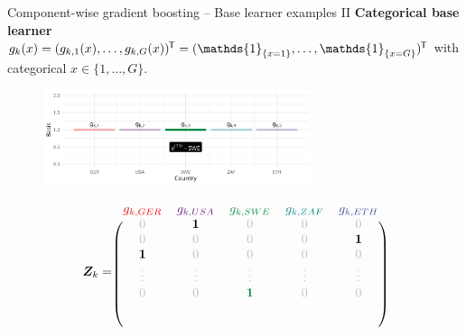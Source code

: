 \documentclass[10pt]{beamer}
\begin{document}
\begin{frame}{Component-wise gradient boosting -- Base learner examples II}
  \textbf{Categorical base learner} $g_k(x) = (g_{k,1}(x), \dots, g_{k,G}(x))^\tran = (\mathds{1}_{\{x = 1\}}, \dots, \mathds{1}_{\{x = G\}})^\tran$ with categorical $x\in\{1, \dots, G\}$.

  \begin{center}
    \begin{figure}
      \includegraphics[width=0.7\textwidth]{figures/bs-cat/fig-cat4.png}
    \end{figure}
    \vspace{-0.5cm}
    \scriptsize
    $$
      \design_k = \begin{blockarray}{ccccc}
        \color[HTML]{EE0000}g_{k,GER} & \color[HTML]{631879}g_{k,USA} & \color[HTML]{008B45}g_{k,SWE} & \color[HTML]{008280}g_{k,ZAF} & \color[HTML]{3B4992}g_{k,ETH}\\
      \begin{block}{(ccccc)}
        \color{lightgray}0 & \color{black}\bm{1} & \color{lightgray}0 & \color{lightgray}0 & \color{lightgray}0 \\
      \color{lightgray}0 & \color{lightgray}0 & \color{lightgray}0 & \color{lightgray}0 & \color{black}\bm{1} \\
      \color{black}\bm{1} & \color{lightgray}0 & \color{lightgray}0 & \color{lightgray}0 & \color{lightgray}0 \\
      \color{lightgray}\vdots & \color{lightgray}\vdots & \color{lightgray}\vdots & \color{lightgray}\vdots & \color{lightgray}\vdots \\
      \color{lightgray}0 & \color{lightgray}0 & \color[HTML]{008B45}\bm{1} & \color{lightgray}0 & \color{lightgray}0 \\
      \color{white}0 & \color{white}0 & \color{white}0 & \color{white}0 & \color{white}0 \\
      \color{white}0 & \color{white}0 & \color{white}0 & \color{white}0 & \color{white}0 \color{black}\\
      \end{block}
    \end{blockarray}
    $$
    \normalsize
  \end{center}
\end{frame}
\end{document}
